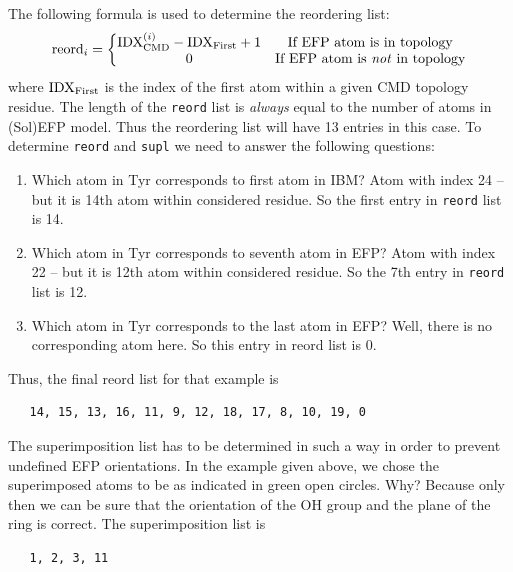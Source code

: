 \documentclass[b5paper,oneside,fleqn,11pt]{book}
\begin{document}
\begin{refsection}
The following formula is used to determine the reordering list:
%
\begin{equation}   \label{e:reord-list}
{\rm reord}_i = 
\left\{\begin{matrix}
{\rm IDX}_{\rm CMD}^{(i)}
 - {\rm IDX}_{\rm First} + 1
                      & \text{If EFP atom is in topology}\\ 
0                     & \text{If EFP atom is \emph{not} in topology}
\end{matrix}\right.
\end{equation}
%
where ${\rm IDX}_{\rm First}$ is the index of the first atom 
within a given CMD topology residue.
The length of the {\tt reord} list is \emph{always} equal 
to the number of atoms in (Sol)EFP model. Thus
the reordering list will have 13 entries in this case.
To determine {\tt reord} and {\tt supl} we need to answer the following questions:
%
\begin{enumerate}
 \item Which atom in Tyr corresponds to first atom in IBM? Atom with index 24 -- but it is
14th atom within considered residue. So the first entry in {\tt reord} list is 14.
 \item Which atom in Tyr corresponds to seventh atom in EFP? Atom with index 22 -- but it is
12th atom within considered residue. So the 7th entry in {\tt reord} list is 12.
\item Which atom in Tyr corresponds to the last atom in EFP? Well, there is no corresponding
atom here. So this entry in reord list is 0.
\end{enumerate}
%
Thus, the final reord list for that example is 
%
\begin{verbatim}
   14, 15, 13, 16, 11, 9, 12, 18, 17, 8, 10, 19, 0
\end{verbatim}
%

The superimposition list has to be determined in such a way in order to prevent undefined EFP
orientations. In the example given above, we chose the superimposed atoms to be as indicated in green
open circles.
Why? Because only then we can be sure that the orientation of the OH group and the plane of the ring
is correct. The superimposition list is 
%
\begin{verbatim}
   1, 2, 3, 11
\end{verbatim}
%


\end{refsection}
\end{document}
